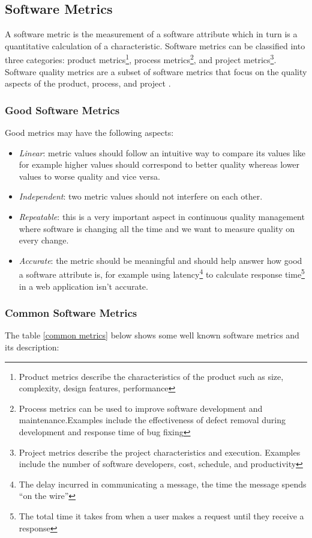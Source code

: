 \subsection{Software Metrics}
\label{sec:soft_metrics}
A software metric is the measurement of a software attribute which in turn is a quantitative calculation of a characteristic. Software metrics can be classified into three categories: product metrics\footnote{Product metrics describe the characteristics of the product such as size, complexity, design features, performance}, process metrics\footnote{Process metrics can be used to improve software development and maintenance.Examples include the effectiveness of defect removal during development and response time of bug fixing}, and project metrics\footnote{Project metrics describe the project characteristics and execution. Examples include the number of
software developers, cost, schedule, and productivity}. Software quality metrics are a subset of software metrics that focus on the quality aspects of the product, process, and project \citep{Kan 2002}.


\subsubsection{Good Software Metrics}
Good metrics may have the following aspects:

\begin{itemize}
  \item \emph{Linear}: metric values should follow an intuitive way to compare its values like for example higher values should correspond to better quality whereas lower values to worse quality and vice versa. 
  \item \emph{Independent}: two metric values should not interfere on each other.
  \item \emph{Repeatable}: this is a very important aspect in continuous quality management where software is changing all the time and we want to measure quality on every change.
  \item \emph{Accurate}: the metric should be meaningful and should help answer how good a software attribute is, for example using latency\footnote{The delay incurred in communicating a message, the time the message spends “on the wire”} to calculate response time\footnote{The total time it takes from when a user makes a request until they receive a response} in a web application isn't accurate.       
\end{itemize}


\subsubsection{Common Software Metrics}
The table \ref{common metrics} below shows some well known software metrics and its description:

